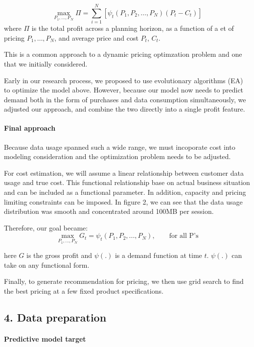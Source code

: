 \documentclass[]{article}
\let\oldparagraph\paragraph
\renewcommand{\paragraph}[1]{\oldparagraph{#1}\mbox{}}
\begin{document}
\[
    \underset{P_1,\dots,P_N}{\max}   \Pi = \sum_{i=1}^N [\psi_t (P_1, P_2, \dots, P_N)(P_t - C_t)]
\] where \(\Pi\) is the total profit across a planning horizon, as a
function of a et of pricing \(P_1, \dots, P_N\), and average price and
cost \(P_t\), \(C_t\).

This is a common approach to a dynamic pricing optimzation problem and
one that we initially considered.

Early in our research process, we proposed to use evolutionary
algorithms (EA) to optimize the model above. However, because our model
now needs to predict demand both in the form of purchases and data
consumption simultaneously, we adjusted our approach, and combine the
two directly into a single profit feature.

\hypertarget{final-approach}{%
\paragraph{Final approach}\label{final-approach}}

Because data usage spanned such a wide range, we must incoporate cost
into modeling consideration and the optimization problem needs to be
adjusted.

For cost estimation, we will assume a linear relationship between
customer data usage and true cost. This functional relationship base on
actual business situation and can be included as a functional parameter.
In addition, capacity and pricing limiting constraints can be imposed.
In figure 2, we can see that the data usage distribution was smooth and
concentrated around 100MB per session.

Therefore, our goal became: \[
     \underset{P_1,\dots,P_N}{\max}   G_t = \psi_t (P_1, P_2, ..., P_N),  \qquad \text{for all P's}
\]

here \(G\) is the gross profit and \(\psi(.)\) is a demand function at
time \(t\). \(\psi(.)\) can take on any functional form.

Finally, to generate recommendation for pricing, we then use grid search
to find the best pricing at a few fixed product specifications.

\hypertarget{data-preparation}{%
\subsection{4. Data preparation}\label{data-preparation}}

\hypertarget{predictive-model-target}{%
\paragraph{Predictive model target}\label{predictive-model-target}}
\end{document}
